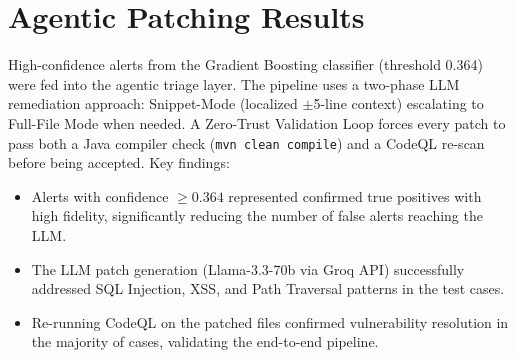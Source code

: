 \section{Agentic Patching Results}

High-confidence alerts from the Gradient Boosting classifier (threshold 0.364) were fed
into the agentic triage layer. The pipeline uses a two-phase LLM remediation approach:
Snippet-Mode (localized $\pm$5-line context) escalating to Full-File Mode when needed.
A Zero-Trust Validation Loop forces every patch to pass both a Java compiler check
(\texttt{mvn clean compile}) and a CodeQL re-scan before being accepted. Key findings:

\begin{itemize}
  \item Alerts with confidence $\geq 0.364$ represented confirmed true positives with
        high fidelity, significantly reducing the number of false alerts reaching the LLM.
  \item The LLM patch generation (Llama-3.3-70b via Groq API) successfully addressed
        SQL Injection, XSS, and Path Traversal patterns in the test cases.
  \item Re-running CodeQL on the patched files confirmed vulnerability resolution in
        the majority of cases, validating the end-to-end pipeline.
\end{itemize}

